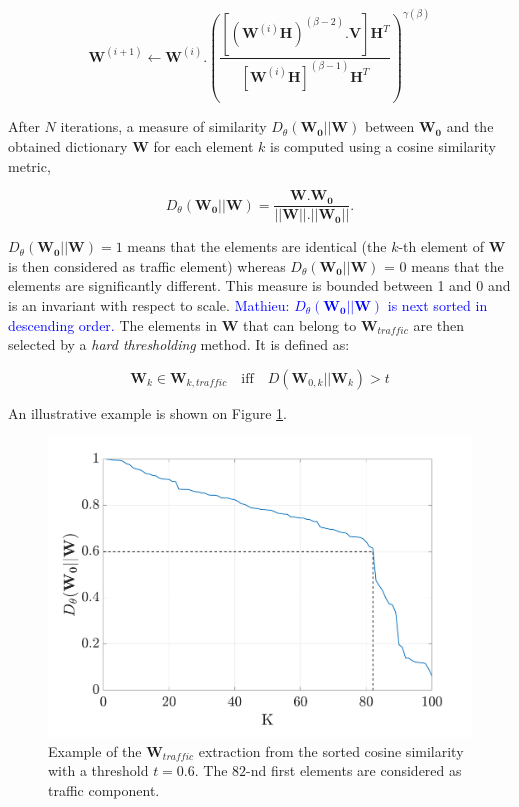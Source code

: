\documentclass[twocolumn,a4paper,10pt]{article}
\newcommand{\ml}[1]{\textcolor{blue}{ Mathieu: #1}}
\begin{document}
\begin{equation}\label{eq:updateW_unsup}
\textbf{W}^{(i+1)} \leftarrow \mathbf{W}^{(i)}.\left(\frac{\left[\left(\mathbf{W}^{(i)}\mathbf{H} \right)^{(\beta-2)}.\mathbf{V} \right]\mathbf{H}^T}{\left[\mathbf{W}^{(i)}\mathbf{H} \right]^{(\beta-1)}\mathbf{H}^T}\right)^{\gamma(\beta)}
\end{equation}

After $N$ iterations, a measure of similarity $D_{\theta}\left(\mathbf{W_0} \vert \vert \mathbf{W} \right)$ between $\mathbf{W_0}$ and the obtained dictionary $\mathbf{W}$ for each element $k$ is computed using a cosine similarity metric,

\begin{equation}
D_{\theta}\left(\mathbf{W_0} \vert \vert \mathbf{W} \right) = \frac{\mathbf{W}.\mathbf{W_0}}{\vert \vert \mathbf{W}  \vert \vert . \vert \vert \mathbf{W_0} \vert \vert}.
\end{equation}

$D_{\theta}\left(\mathbf{W_0} \vert \vert \mathbf{W} \right) = 1$ means that the elements are identical (the $k$-th element of $\mathbf{W}$ is then considered as traffic element) whereas $D_{\theta}\left(\mathbf{W_0} \vert \vert \mathbf{W} \right)$ = 0 means that the elements are significantly different. This measure is bounded between 1 and 0 and is an invariant with respect to scale. \ml{ $D_{\theta}\left(\mathbf{W_0} \vert \vert \mathbf{W} \right)$ is next sorted in descending order. } The elements in $\mathbf{W}$ that can belong to $\mathbf{W}_{traffic}$ are then selected by a \textit{hard thresholding} method. It is defined as:

\begin{equation}
\mathbf{W}_k \in \mathbf{W}_{k,traffic} \quad \text{iff} \quad D\left(\mathbf{W}_{0,k} \vert \vert \mathbf{W}_{k} \right) > t
\end{equation}

An illustrative example is shown on Figure \ref{fig:W_TI_NMF}.\\

\begin{figure}[hbtp]
\centering
\includegraphics[width=0.8\linewidth]{figures/distanceCosLinDisplay.pdf}
\caption{Example of the $\mathbf{W}_{traffic}$ extraction from the sorted cosine similarity with a threshold $t = 0.6$. The $82$-nd first elements are considered as traffic component.}
\label{fig:W_TI_NMF}
\end{figure}
\end{document}
